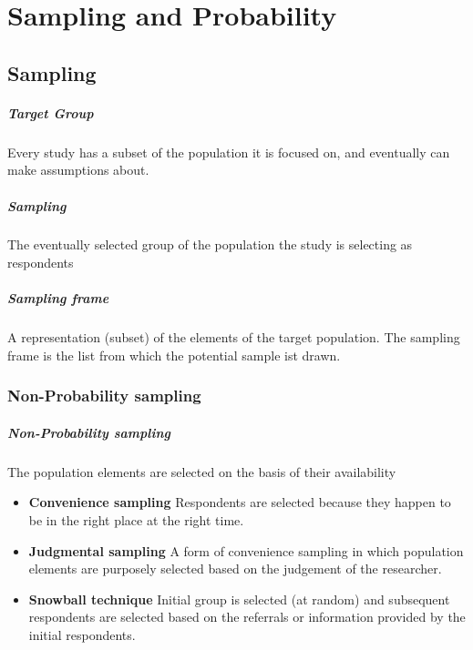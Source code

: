 \documentclass[11pt]{article}
\begin{document}
    \chapter{Sampling and Probability}

    \section{Sampling}
    
    \paragraph{Target Group} Every study has a subset of the population it is focused on, and eventually can make assumptions about.
    
    \paragraph{Sampling} The eventually selected group of the population the study is selecting as respondents
    
    \paragraph{Sampling frame} A representation (subset) of the elements of the target population. 
    The sampling frame is the list from which the potential sample ist drawn.

    \subsection{Non-Probability sampling}
    
    \paragraph{Non-Probability sampling} The population elements are selected on the basis of their availability

    \begin{itemize}
        \item \textbf{Convenience sampling} Respondents are selected because they happen to be in the right place at the right time.
        \item \textbf{Judgmental sampling} A form of convenience sampling in which population elements are purposely selected based on the judgement of the researcher.
        \item \textbf{Snowball technique} Initial group is selected (at random) and subsequent respondents are selected based on the referrals or information provided by the initial respondents.
    \end{itemize}
    
\end{document}
